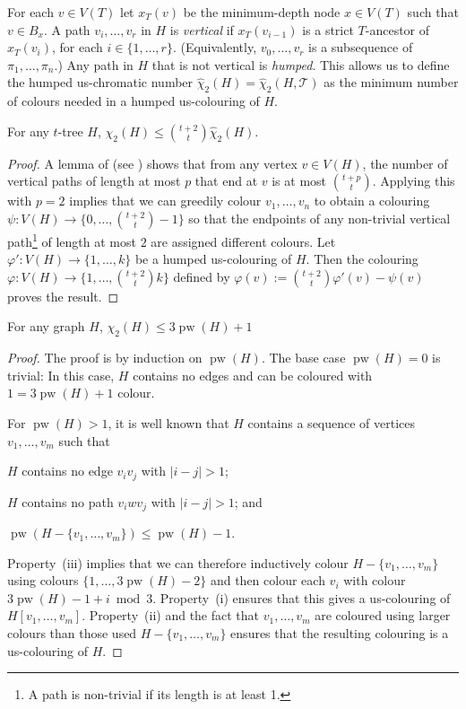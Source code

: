 \documentclass[kpfonts]{patmorin}
\DeclareMathOperator{\pw}{pw}
\newcommand{\uqs}{\chi_2}
\newcommand{\hus}{\hat{\chi}_2}
\begin{document}
For each $v\in V(T)$ let $x_T(v)$ be the minimum-depth node $x\in V(T)$ such that $v\in B_x$.  A path $v_i,\ldots,v_r$ in $H$ is \emph{vertical} if $x_T(v_{i-1})$ is a strict $T$-ancestor of $x_T(v_i)$, for each $i\in\{1,\ldots,r\}$. (Equivalently, $v_0,\ldots,v_r$ is a subsequence of $\pi_1,\ldots,\pi_n$.) Any path in $H$ that is not vertical is \emph{humped}.  This allows us to define the humped us-chromatic number $\hus(H)=\hus(H,\mathcal{T})$ as the minimum number of colours needed in a humped us-colouring of $H$.

\begin{lem}\label{humped}
    For any $t$-tree $H$, $\uqs(H)\le \binom{t+2}{t}\hus(H)$.
\end{lem}

\begin{proof}
    A lemma of \citet{pilipczuk.siebertz:polynomial} (see \cite[Lemma~13]{pilipczuk.siebertz:polynomial-arxiv}) shows that from any vertex $v\in V(H)$, the number of vertical paths of length at most $p$ that end at $v$ is at most $\binom{t+p}{t}$.  Applying this with $p=2$ implies that we can greedily colour $v_1,\ldots,v_n$ to obtain a colouring $\psi:V(H)\to \{0,\ldots,\binom{t+2}{t}-1\}$ so that the endpoints of any non-trivial vertical path\footnote{A path is non-trivial if its length is at least 1.} of length at most $2$ are assigned different colours.  Let $\varphi':V(H)\to\{1,\ldots,k\}$ be a humped us-colouring of $H$.  Then the colouring $\varphi:V(H)\to\{1,\ldots,\binom{t+2}{t}k\}$ defined by $\varphi(v):=\binom{t+2}{t}\varphi'(v)-\psi(v)$ proves the result.
\end{proof}


\begin{lem}\label{pathwidth}
    For any graph $H$, $\uqs(H)\le 3\pw(H) + 1$
\end{lem}

\begin{proof}
    The proof is by induction on $\pw(H)$.  The base case $\pw(H)=0$ is trivial: In this case, $H$ contains no edges and can be coloured with $1 = 3\pw(H)+1$ colour.

    For $\pw(H)>1$, it is well known that $H$ contains a sequence of vertices $v_1,\ldots,v_m$  such that
    \begin{inparaenum}[(i)]
        \item $H$ contains no edge $v_iv_j$ with $|i-j|>1$;
        \item $H$ contains no path $v_iw v_j$ with $|i-j|>1$; and
        \item $\pw(H-\{v_1,\ldots,v_m\})\le \pw(H)-1$.
    \end{inparaenum}
    Property~(iii) implies that we can therefore inductively colour $H-\{v_1,\ldots,v_m\}$ using colours $\{1,\ldots,3\pw(H)-2\}$ and then colour each $v_i$ with colour $3\pw(H)-1+i\bmod 3$.  Property~(i) ensures that this gives a us-colouring of $H[v_1,\ldots,v_m]$.  Property~(ii) and the fact that $v_1,\ldots,v_m$ are coloured using larger colours than those used $H-\{v_1,\ldots,v_m\}$ ensures that the resulting colouring is a us-colouring of $H$.
\end{proof}
\end{document}
